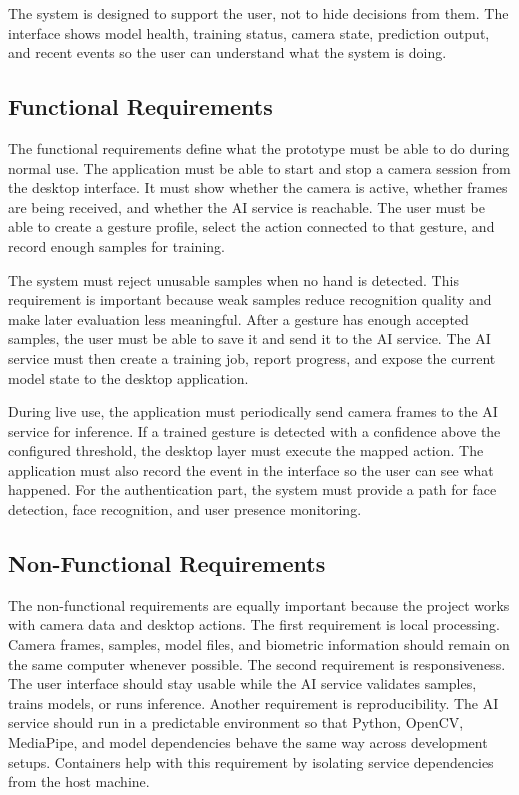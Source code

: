 \documentclass[10pt,twocolumn]{article}
\begin{document}
The system is designed to support the user, not to hide decisions from them.
The interface shows model health, training status, camera state, prediction output, and recent events so the user can understand what the system is doing.

\subsection{Functional Requirements}
The functional requirements define what the prototype must be able to do during normal use.
The application must be able to start and stop a camera session from the desktop interface.
It must show whether the camera is active, whether frames are being received, and whether the AI service is reachable.
The user must be able to create a gesture profile, select the action connected to that gesture, and record enough samples for training.

The system must reject unusable samples when no hand is detected.
This requirement is important because weak samples reduce recognition quality and make later evaluation less meaningful.
After a gesture has enough accepted samples, the user must be able to save it and send it to the AI service.
The AI service must then create a training job, report progress, and expose the current model state to the desktop application.

During live use, the application must periodically send camera frames to the AI service for inference.
If a trained gesture is detected with a confidence above the configured threshold, the desktop layer must execute the mapped action.
The application must also record the event in the interface so the user can see what happened.
For the authentication part, the system must provide a path for face detection, face recognition, and user presence monitoring.

\subsection{Non-Functional Requirements}
The non-functional requirements are equally important because the project works with camera data and desktop actions.
The first requirement is local processing.
Camera frames, samples, model files, and biometric information should remain on the same computer whenever possible.
The second requirement is responsiveness.
The user interface should stay usable while the AI service validates samples, trains models, or runs inference.
Another requirement is reproducibility.
The AI service should run in a predictable environment so that Python, OpenCV, MediaPipe, and model dependencies behave the same way across development setups.
Containers help with this requirement by isolating service dependencies from the host machine.
\end{document}
